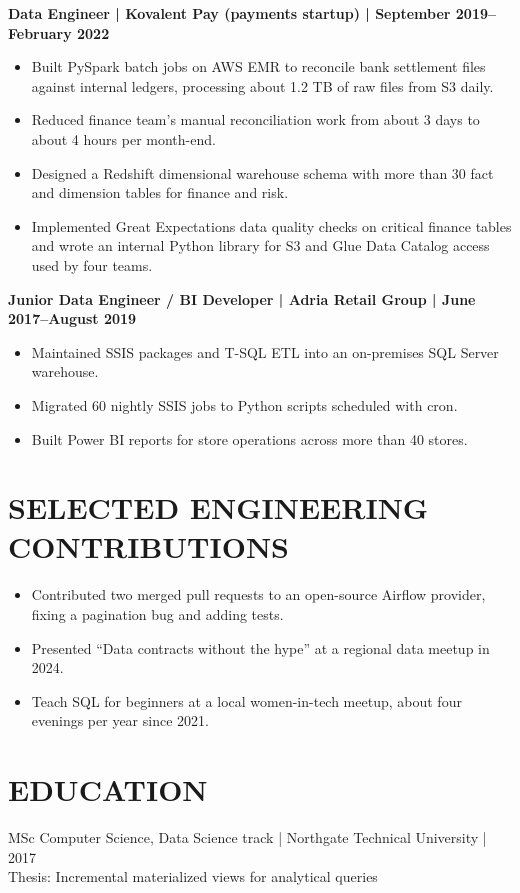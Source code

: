 \documentclass[11pt,a4paper]{article}
\begin{document}
\noindent\textbf{Data Engineer | Kovalent Pay (payments startup) | September 2019--February 2022}
\begin{itemize}
\item Built PySpark batch jobs on AWS EMR to reconcile bank settlement files against internal ledgers, processing about 1.2 TB of raw files from S3 daily.
\item Reduced finance team's manual reconciliation work from about 3 days to about 4 hours per month-end.
\item Designed a Redshift dimensional warehouse schema with more than 30 fact and dimension tables for finance and risk.
\item Implemented Great Expectations data quality checks on critical finance tables and wrote an internal Python library for S3 and Glue Data Catalog access used by four teams.
\end{itemize}

\noindent\textbf{Junior Data Engineer / BI Developer | Adria Retail Group | June 2017--August 2019}
\begin{itemize}
\item Maintained SSIS packages and T-SQL ETL into an on-premises SQL Server warehouse.
\item Migrated 60 nightly SSIS jobs to Python scripts scheduled with cron.
\item Built Power BI reports for store operations across more than 40 stores.
\end{itemize}

\section*{SELECTED ENGINEERING CONTRIBUTIONS}
\begin{itemize}
\item Contributed two merged pull requests to an open-source Airflow provider, fixing a pagination bug and adding tests.
\item Presented “Data contracts without the hype” at a regional data meetup in 2024.
\item Teach SQL for beginners at a local women-in-tech meetup, about four evenings per year since 2021.
\end{itemize}

\section*{EDUCATION}
MSc Computer Science, Data Science track | Northgate Technical University | 2017\\
Thesis: Incremental materialized views for analytical queries
\end{document}
